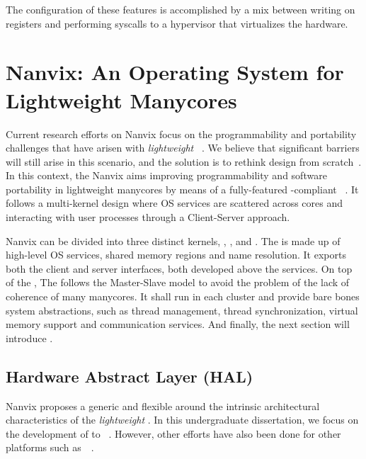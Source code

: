 	The configuration of these features is accomplished by a mix between
	writing on \dma registers and performing syscalls to a hypervisor
	that virtualizes the \mppa hardware.

\section{Nanvix: An Operating System for Lightweight Manycores}
\label{sec.nanvix}

	Current research efforts on Nanvix \os focus on the programmability and portability
	challenges that have arisen with \textit{lightweight \manycores}~\cite{christgau2017, gamell2012, serres2011}.
	We believe that significant barriers will still arise in this scenario, and the
	solution is to rethink \os design from scratch~\cite{penna:compas19, penna2019}. 
	In this context, the Nanvix \os aims improving programmability and
	software portability in lightweight manycores by means of a fully-featured
	\posix-compliant \os~\cite{penna:compas19}.
	It follows a multi-kernel design where OS services are scattered across cores and
	interacting with user processes through a Client-Server approach.
	
	Nanvix \os can be divided into three distinct kernels, \multikernel,
	\microkernel, and \hal.
	The \multikernel is made up of high-level OS services, \eg shared memory
	regions and name resolution.
	It exports both the client and server interfaces, both developed above
	the \microkernel services.
	On top of the \hal, The \microkernel follows the Master-Slave \os model
	to avoid the problem of the lack of coherence of many manycores.
	It shall run in each cluster and provide bare bones system abstractions,
	such as thread management, thread synchronization,
	virtual memory support and communication services.
	And finally, the next section will introduce \hal.

	\subsection{Hardware Abstract Layer (HAL)}
	\label{sec.hal}

		Nanvix \os proposes a generic and flexible \hal around the
		intrinsic architectural characteristics of the \textit{lightweight \manycores}.
		In this undergraduate dissertation, we  focus on the development of \hal
		to \mppa~\cite{DeDinechin2013-1}.
		However, other efforts have also been done for other platforms such
		as~\optimsoc~\cite{Wallentowitz2013}.

